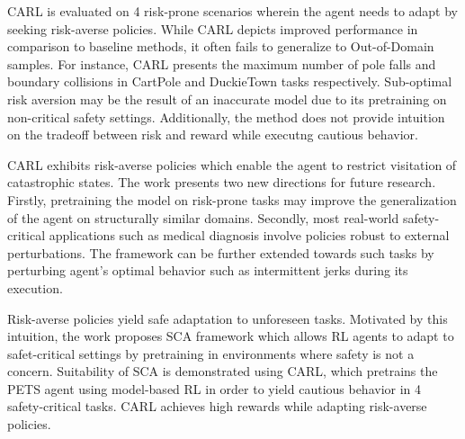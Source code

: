\documentclass[11pt,letterpaper]{article}
\begin{document}
CARL is evaluated on 4 risk-prone scenarios wherein the agent needs to adapt by seeking risk-averse policies. While CARL depicts improved performance in comparison to baseline methods, it often fails to generalize to Out-of-Domain samples. For instance, CARL presents the maximum number of pole falls and boundary collisions in CartPole and DuckieTown tasks respectively. Sub-optimal risk aversion may be the result of an inaccurate model due to its pretraining on non-critical safety settings. Additionally, the method does not provide intuition on the tradeoff between risk and reward while executng cautious behavior. 

CARL exhibits risk-averse policies which enable the agent to restrict visitation of catastrophic states. The work presents two new directions for future research. Firstly, pretraining the model on risk-prone tasks may improve the generalization of the agent on structurally similar domains. Secondly, most real-world safety-critical applications such as medical diagnosis involve policies robust to external perturbations. The framework can be further extended towards such tasks by perturbing agent's optimal behavior such as intermittent jerks during its execution. 

Risk-averse policies yield safe adaptation to unforeseen tasks. Motivated by this intuition, the work proposes SCA framework which allows RL agents to adapt to safet-critical settings by pretraining in environments where safety is not a concern. Suitability of SCA is demonstrated using CARL, which pretrains the PETS agent using model-based RL in order to yield cautious behavior in 4 safety-critical tasks. CARL achieves high rewards while adapting risk-averse policies. 
\end{document}
